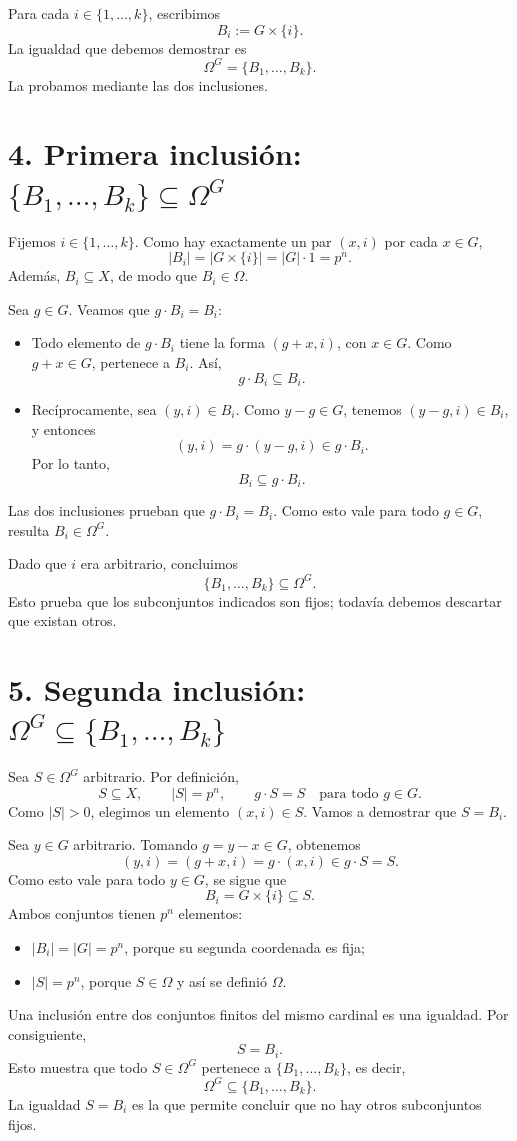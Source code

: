 \documentclass[11pt,a4paper]{article}
\begin{document}
Para cada $i\in\{1,\ldots,k\}$, escribimos
\[
B_i:=G\times\{i\}.
\]
La igualdad que debemos demostrar es
\[
\Omega^G=\{B_1,\ldots,B_k\}.
\]
La probamos mediante las dos inclusiones.

\section*{4. Primera inclusión: $\{B_1,\ldots,B_k\}\subseteq\Omega^G$}
Fijemos $i\in\{1,\ldots,k\}$. Como hay exactamente un par $(x,i)$ por cada $x\in G$,
\[
|B_i|=|G\times\{i\}|=|G|\cdot1=p^n.
\]
Además, $B_i\subseteq X$, de modo que $B_i\in\Omega$.

Sea $g\in G$. Veamos que $g\cdot B_i=B_i$:
\begin{itemize}
\item Todo elemento de $g\cdot B_i$ tiene la forma $(g+x,i)$, con $x\in G$. Como $g+x\in G$, pertenece a $B_i$. Así,
\[
g\cdot B_i\subseteq B_i.
\]
\item Recíprocamente, sea $(y,i)\in B_i$. Como $y-g\in G$, tenemos $(y-g,i)\in B_i$, y entonces
\[
(y,i)=g\cdot(y-g,i)\in g\cdot B_i.
\]
Por lo tanto,
\[
B_i\subseteq g\cdot B_i.
\]
\end{itemize}
Las dos inclusiones prueban que $g\cdot B_i=B_i$. Como esto vale para todo $g\in G$, resulta $B_i\in\Omega^G$.

Dado que $i$ era arbitrario, concluimos
\[
\{B_1,\ldots,B_k\}\subseteq\Omega^G.
\]
Esto prueba que los subconjuntos indicados son fijos; todavía debemos descartar que existan otros.

\newpage
\section*{5. Segunda inclusión: $\Omega^G\subseteq\{B_1,\ldots,B_k\}$}
Sea $S\in\Omega^G$ arbitrario. Por definición,
\[
S\subseteq X,\qquad |S|=p^n,\qquad g\cdot S=S\quad\text{para todo }g\in G.
\]
Como $|S|>0$, elegimos un elemento $(x,i)\in S$. Vamos a demostrar que $S=B_i$.

Sea $y\in G$ arbitrario. Tomando $g=y-x\in G$, obtenemos
\[
(y,i)=(g+x,i)=g\cdot(x,i)\in g\cdot S=S.
\]
Como esto vale para todo $y\in G$, se sigue que
\[
B_i=G\times\{i\}\subseteq S.
\]
Ambos conjuntos tienen $p^n$ elementos:
\begin{itemize}
\item $|B_i|=|G|=p^n$, porque su segunda coordenada es fija;
\item $|S|=p^n$, porque $S\in\Omega$ y así se definió $\Omega$.
\end{itemize}
Una inclusión entre dos conjuntos finitos del mismo cardinal es una igualdad. Por consiguiente,
\[
S=B_i.
\]
Esto muestra que todo $S\in\Omega^G$ pertenece a $\{B_1,\ldots,B_k\}$, es decir,
\[
\Omega^G\subseteq\{B_1,\ldots,B_k\}.
\]
La igualdad $S=B_i$ es la que permite concluir que no hay otros subconjuntos fijos.
\end{document}
